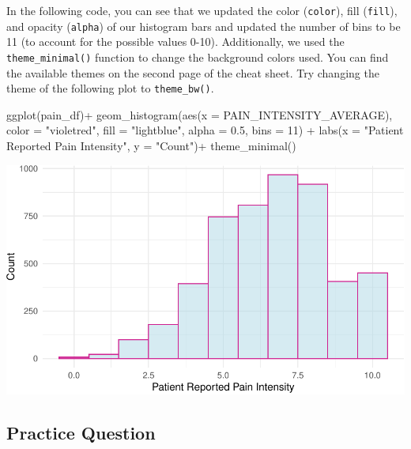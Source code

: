 \documentclass[
  letterpaper,
]{latex/krantz}
\makeatletter
\newenvironment{Shaded}{\begin{snugshade}}{\end{snugshade}}
\newcommand{\AttributeTok}[1]{\textcolor[rgb]{0.40,0.45,0.13}{#1}}
\newcommand{\DecValTok}[1]{\textcolor[rgb]{0.68,0.00,0.00}{#1}}
\newcommand{\FloatTok}[1]{\textcolor[rgb]{0.68,0.00,0.00}{#1}}
\newcommand{\FunctionTok}[1]{\textcolor[rgb]{0.28,0.35,0.67}{#1}}
\newcommand{\NormalTok}[1]{\textcolor[rgb]{0.00,0.23,0.31}{#1}}
\newcommand{\SpecialCharTok}[1]{\textcolor[rgb]{0.37,0.37,0.37}{#1}}
\newcommand{\StringTok}[1]{\textcolor[rgb]{0.13,0.47,0.30}{#1}}
\newenvironment{kframe}{%
\medskip{}
\setlength{\fboxsep}{.8em}
 \def\at@end@of@kframe{}%
 \ifinner\ifhmode%
  \def\at@end@of@kframe{\end{minipage}}%
  \begin{minipage}{\columnwidth}%
 \fi\fi%
 \def\FrameCommand##1{\hskip\@totalleftmargin \hskip-\fboxsep
 \colorbox{shadecolor}{##1}\hskip-\fboxsep
     \hskip-\linewidth \hskip-\@totalleftmargin \hskip\columnwidth}%
 \MakeFramed {\advance\hsize-\width
   \@totalleftmargin\z@ \linewidth\hsize
   \@setminipage}}%
 {\par\unskip\endMakeFramed%
 \at@end@of@kframe}
\renewenvironment{Shaded}{\begin{kframe}}{\end{kframe}}
\makeatother
\begin{document}
In the following code, you can see that we updated the color
(\texttt{color}), fill (\texttt{fill}), and opacity (\texttt{alpha}) of
our histogram bars and updated the number of bins to be 11 (to account
for the possible values 0-10). Additionally, we used the
\texttt{theme\_minimal()}
function to change the background colors used. You can find the
available themes  on the second page of the cheat
sheet. Try changing the theme of the following plot to
\texttt{theme\_bw()}.

\begin{Shaded}
\begin{Highlighting}[]
\FunctionTok{ggplot}\NormalTok{(pain\_df)}\SpecialCharTok{+}
  \FunctionTok{geom\_histogram}\NormalTok{(}\FunctionTok{aes}\NormalTok{(}\AttributeTok{x =}\NormalTok{ PAIN\_INTENSITY\_AVERAGE), }\AttributeTok{color =} \StringTok{"violetred"}\NormalTok{, }
                 \AttributeTok{fill =} \StringTok{"lightblue"}\NormalTok{, }\AttributeTok{alpha =} \FloatTok{0.5}\NormalTok{, }\AttributeTok{bins =} \DecValTok{11}\NormalTok{) }\SpecialCharTok{+}
  \FunctionTok{labs}\NormalTok{(}\AttributeTok{x =} \StringTok{"Patient Reported Pain Intensity"}\NormalTok{, }\AttributeTok{y =} \StringTok{"Count"}\NormalTok{)}\SpecialCharTok{+}
  \FunctionTok{theme\_minimal}\NormalTok{()}
\end{Highlighting}
\end{Shaded}

\begin{center}
\includegraphics[width=1\textwidth,height=\textheight]{book/visualization_ggplot_files/figure-pdf/unnamed-chunk-6-1.pdf}
\end{center}

\subsection{Practice Question}\label{practice-question-13}
\end{document}
